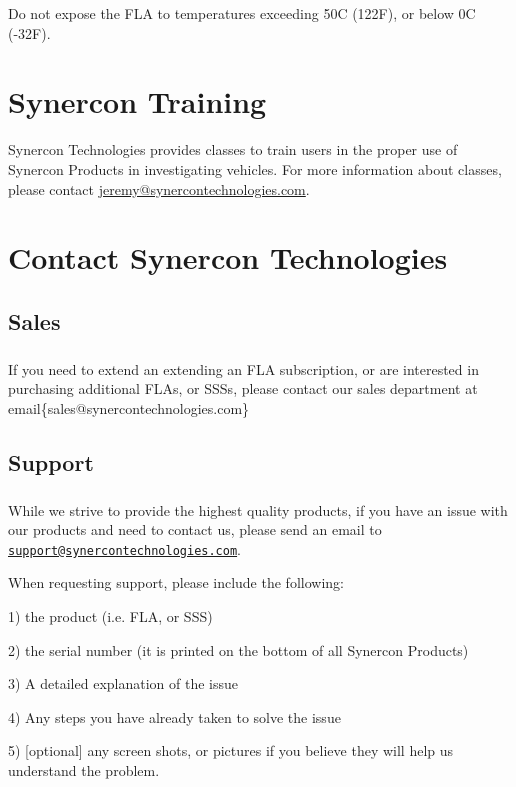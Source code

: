 \documentclass[11pt, oneside]{book}
\begin{document}
Do not expose the FLA to temperatures exceeding 50C (122F), or below
0C (-32F).


\chapter{Synercon Training}

Synercon Technologies provides classes to train users in the proper
use of Synercon Products in investigating vehicles. For more information about classes, please contact \url{jeremy@synercontechnologies.com}.

\begingroup
\renewcommand{\cleardoublepage}{}
\renewcommand{\clearpage}{}
\chapter{Contact Synercon Technologies}\label{chap:contact_syn}
\endgroup
\section*{Sales}
\paragraph{  }
If you need to extend an extending an FLA subscription, or are interested in purchasing additional FLAs, or SSSs, please contact our sales department at email\{sales@synercontechnologies.com\}
\section*{Support}
\paragraph{  }
While we strive to provide the highest quality products, if you have
an issue with our products and need to contact us, please send an
email to \href{mailto:support@synercontechnologies.com}{\nolinkurl{support@synercontechnologies.com}}.

When requesting support, please include the following:

1) the product (i.e. FLA, or SSS)

2) the serial number (it is printed on the bottom of all Synercon
Products)

3) A detailed explanation of the issue

4) Any steps you have already taken to solve the issue

5) {[}optional{]} any screen shots, or pictures if you believe they
will help us understand the problem.
\end{document}
